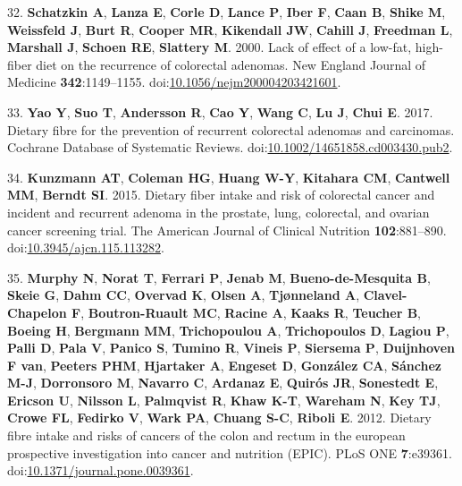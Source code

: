 \documentclass[11pt,]{article}
\begin{document}
\leavevmode\hypertarget{ref-Schatzkin2000}{}%
32. \textbf{Schatzkin A}, \textbf{Lanza E}, \textbf{Corle D},
\textbf{Lance P}, \textbf{Iber F}, \textbf{Caan B}, \textbf{Shike M},
\textbf{Weissfeld J}, \textbf{Burt R}, \textbf{Cooper MR},
\textbf{Kikendall JW}, \textbf{Cahill J}, \textbf{Freedman L},
\textbf{Marshall J}, \textbf{Schoen RE}, \textbf{Slattery M}. 2000. Lack
of effect of a low-fat, high-fiber diet on the recurrence of colorectal
adenomas. New England Journal of Medicine \textbf{342}:1149--1155.
doi:\href{https://doi.org/10.1056/nejm200004203421601}{10.1056/nejm200004203421601}.

\leavevmode\hypertarget{ref-Yao2017}{}%
33. \textbf{Yao Y}, \textbf{Suo T}, \textbf{Andersson R}, \textbf{Cao
Y}, \textbf{Wang C}, \textbf{Lu J}, \textbf{Chui E}. 2017. Dietary fibre
for the prevention of recurrent colorectal adenomas and carcinomas.
Cochrane Database of Systematic Reviews.
doi:\href{https://doi.org/10.1002/14651858.cd003430.pub2}{10.1002/14651858.cd003430.pub2}.

\leavevmode\hypertarget{ref-Kunzmann2015}{}%
34. \textbf{Kunzmann AT}, \textbf{Coleman HG}, \textbf{Huang W-Y},
\textbf{Kitahara CM}, \textbf{Cantwell MM}, \textbf{Berndt SI}. 2015.
Dietary fiber intake and risk of colorectal cancer and incident and
recurrent adenoma in the prostate, lung, colorectal, and ovarian cancer
screening trial. The American Journal of Clinical Nutrition
\textbf{102}:881--890.
doi:\href{https://doi.org/10.3945/ajcn.115.113282}{10.3945/ajcn.115.113282}.

\leavevmode\hypertarget{ref-Murphy2012}{}%
35. \textbf{Murphy N}, \textbf{Norat T}, \textbf{Ferrari P},
\textbf{Jenab M}, \textbf{Bueno-de-Mesquita B}, \textbf{Skeie G},
\textbf{Dahm CC}, \textbf{Overvad K}, \textbf{Olsen A},
\textbf{Tjønneland A}, \textbf{Clavel-Chapelon F},
\textbf{Boutron-Ruault MC}, \textbf{Racine A}, \textbf{Kaaks R},
\textbf{Teucher B}, \textbf{Boeing H}, \textbf{Bergmann MM},
\textbf{Trichopoulou A}, \textbf{Trichopoulos D}, \textbf{Lagiou P},
\textbf{Palli D}, \textbf{Pala V}, \textbf{Panico S}, \textbf{Tumino R},
\textbf{Vineis P}, \textbf{Siersema P}, \textbf{Duijnhoven F van},
\textbf{Peeters PHM}, \textbf{Hjartaker A}, \textbf{Engeset D},
\textbf{González CA}, \textbf{Sánchez M-J}, \textbf{Dorronsoro M},
\textbf{Navarro C}, \textbf{Ardanaz E}, \textbf{Quirós JR},
\textbf{Sonestedt E}, \textbf{Ericson U}, \textbf{Nilsson L},
\textbf{Palmqvist R}, \textbf{Khaw K-T}, \textbf{Wareham N}, \textbf{Key
TJ}, \textbf{Crowe FL}, \textbf{Fedirko V}, \textbf{Wark PA},
\textbf{Chuang S-C}, \textbf{Riboli E}. 2012. Dietary fibre intake and
risks of cancers of the colon and rectum in the european prospective
investigation into cancer and nutrition (EPIC). PLoS ONE
\textbf{7}:e39361.
doi:\href{https://doi.org/10.1371/journal.pone.0039361}{10.1371/journal.pone.0039361}.
\end{document}
